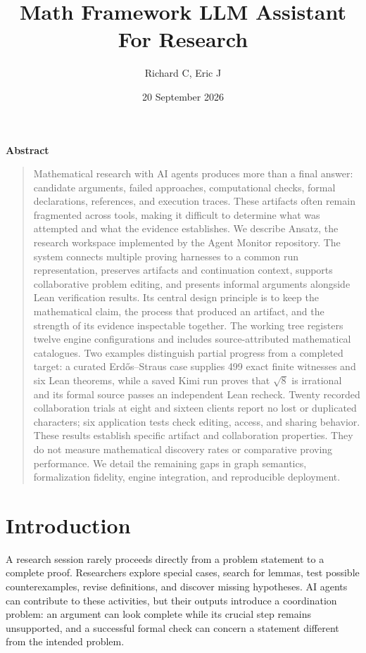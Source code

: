 \documentclass[10pt,letterpaper]{article}
\title{Math Framework LLM Assistant For Research}
\author{Richard C, Eric J}
\date{20 September 2026}
\makeatletter
\renewcommand{\maketitle}{%
  \vspace*{0.1in}
  \begin{center}
    {\fontsize{14}{16}\selectfont\bfseries\@title\par}
    \vspace{1em}
    {\normalsize\@author\par}
  \end{center}
  \vspace{0.15in}
  \thispagestyle{firstpage}}
\renewenvironment{abstract}
  {\begin{center}\begin{tcolorbox}[
     colframe=accent,colback=white,arc=2mm,boxrule=0.9pt,
     left=1mm,right=1mm,top=3mm,bottom=4mm,enhanced,width=0.95\textwidth]
     {\centering\large\bfseries\color{accent}Abstract\par}\vspace{1ex}
     \begin{quote}}
  {\end{quote}\end{tcolorbox}\end{center}}
\makeatother
\begin{document}
\maketitle


\begin{abstract}
Mathematical research with AI agents produces more than a final answer: candidate arguments, failed approaches, computational checks, formal declarations, references, and execution traces. These artifacts often remain fragmented across tools, making it difficult to determine what was attempted and what the evidence establishes. We describe Ansatz, the research workspace implemented by the Agent Monitor repository. The system connects multiple proving harnesses to a common run representation, preserves artifacts and continuation context, supports collaborative problem editing, and presents informal arguments alongside Lean verification results. Its central design principle is to keep the mathematical claim, the process that produced an artifact, and the strength of its evidence inspectable together. The working tree registers twelve engine configurations and includes source-attributed mathematical catalogues. Two examples distinguish partial progress from a completed target: a curated Erd\H{o}s--Straus case supplies 499 exact finite witnesses and six Lean theorems, while a saved Kimi run proves that $\sqrt{8}$ is irrational and its formal source passes an independent Lean recheck. Twenty recorded collaboration trials at eight and sixteen clients report no lost or duplicated characters; six application tests check editing, access, and sharing behavior. These results establish specific artifact and collaboration properties. They do not measure mathematical discovery rates or comparative proving performance. We detail the remaining gaps in graph semantics, formalization fidelity, engine integration, and reproducible deployment.
\end{abstract}

\section{Introduction}

A research session rarely proceeds directly from a problem statement to a complete proof. Researchers explore special cases, search for lemmas, test possible counterexamples, revise definitions, and discover missing hypotheses. AI agents can contribute to these activities, but their outputs introduce a coordination problem: an argument can look complete while its crucial step remains unsupported, and a successful formal check can concern a statement different from the intended problem.
\end{document}
